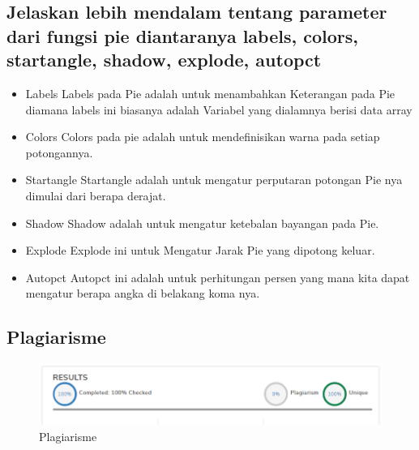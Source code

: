 \subsection{Jelaskan lebih mendalam tentang parameter dari fungsi pie diantaranya labels, colors, startangle, shadow, explode, autopct}
\begin{itemize}
	\item Labels\newline
	Labels pada Pie adalah untuk menambahkan Keterangan pada Pie diamana labels ini biasanya adalah Variabel yang dialamnya berisi data array
	\item Colors\newline
	Colors pada pie adalah untuk mendefinisikan warna pada setiap potongannya.
	\item Startangle\newline
	Startangle adalah untuk mengatur perputaran potongan Pie nya dimulai dari berapa derajat.
	\item Shadow\newline
	Shadow adalah untuk mengatur ketebalan bayangan pada Pie.
	\item Explode\newline
	Explode ini untuk Mengatur Jarak Pie yang dipotong keluar.
	\item Autopct\newline
	Autopct ini adalah untuk perhitungan persen yang mana kita dapat mengatur berapa angka di belakang koma nya. 
\end{itemize}

\subsection{Plagiarisme}
\begin{figure}[h]
\centering
\includegraphics[scale=0.2]{figures/6/Teori/1174025/noplg.png}
\caption{Plagiarisme}
\label{fig:plagiat}
\end{figure}
